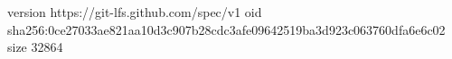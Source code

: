 version https://git-lfs.github.com/spec/v1
oid sha256:0ce27033ae821aa10d3c907b28cdc3afe09642519ba3d923c063760dfa6e6c02
size 32864
